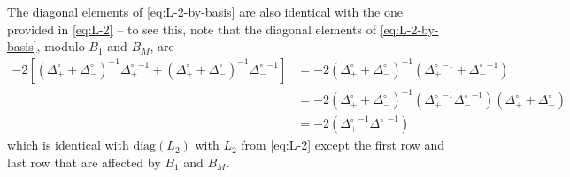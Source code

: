 \documentclass[11pt]{article}
\theoremstyle{definition}
\begin{document}
The diagonal elements of \eqref{eq:L-2-by-basis} are also identical with the one provided in \eqref{eq:L-2} -- to see this, note that the diagonal elements of \eqref{eq:L-2-by-basis}, modulo $B_1$ and $B_{M}$, are
\begin{align}
-2 \left[ ({\Delta_{+}^{\circ}} + {\Delta_{-}^{\circ}})^{-1} {\Delta_{+}^{\circ}}^{-1} + ({\Delta_{+}^{\circ}} + {\Delta_{-}^{\circ}})^{-1} {\Delta_{-}^{\circ}}^{-1} \right] &= -2 ({\Delta_{+}^{\circ}} + {\Delta_{-}^{\circ}})^{-1}  ( {\Delta_{+}^{\circ}}^{-1} + {\Delta_{-}^{\circ}}^{-1} ) \\
&= -2({\Delta_{+}^{\circ}} + {\Delta_{-}^{\circ}})^{-1} ({\Delta_{+}^{\circ}}^{-1} {\Delta_{-}^{\circ}}^{-1}) ({\Delta_{+}^{\circ}} + {\Delta_{-}^{\circ}} )  \\
&= -2 ({\Delta_{+}^{\circ}}^{-1} {\Delta_{-}^{\circ}}^{-1})
\end{align}
which is identical with $\text{diag} (L_2)$ with $L_2$ from \eqref{eq:L-2} except the first row and last row that are affected by $B_1$ and $B_{M}$.

\fi



\end{document}
